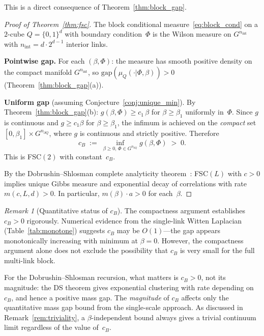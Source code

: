\documentclass[11pt,a4paper]{article}
\theoremstyle{plain}
\theoremstyle{definition}
\theoremstyle{remark}
\newtheorem{remark}[theorem]{Remark}
\newcommand{\gap}{\mathrm{gap}}
\begin{document}
This is a direct consequence of Theorem~\ref{thm:block_gap}.

\begin{proof}[Proof of Theorem~\ref{thm:fsc}]
The block conditional measure~\eqref{eq:block_cond} on a
$2$-cube $Q = \{0, 1\}^d$ with boundary condition~$\Phi$
is the Wilson measure on $G^{n_{\mathrm{int}}}$ with
$n_{\mathrm{int}} = d \cdot 2^{d-1}$ interior links.

\textbf{Pointwise gap.}
For each $(\beta, \Phi)$: the measure has smooth positive
density on the compact manifold $G^{n_{\mathrm{int}}}$,
so $\gap(\mu_Q(\cdot|\Phi,\beta)) > 0$
(Theorem~\ref{thm:block_gap}(a)).

\textbf{Uniform gap}
(assuming Conjecture~\ref{conj:unique_min}).
By Theorem~\ref{thm:block_gap}(b):
$g(\beta, \Phi) \geq c_1\,\beta$ for $\beta \geq \beta_1$
uniformly in~$\Phi$.  Since $g$ is continuous and
$g \geq c_1\beta$ for $\beta \geq \beta_1$,
the infimum is achieved on the \emph{compact} set
$[0, \beta_1] \times G^{n_{\partial Q}}$, where $g$
is continuous and strictly positive.  Therefore
\begin{equation}
  c_B \;:=\;
  \inf_{\beta \geq 0,\, \Phi \in G^{n_{\partial Q}}}
  g(\beta, \Phi) \;>\; 0.
\end{equation}
This is FSC$(2)$ with constant~$c_B$.

By the Dobrushin--Shlosman complete analyticity
theorem~\cite{DobrushinShlosman,Martinelli1999}:
FSC$(L)$ with $c > 0$ implies unique Gibbs measure
and exponential decay of correlations with rate
$m(c, L, d) > 0$. In particular,
$m(\beta) \cdot a > 0$ for each~$\beta$.
\end{proof}

\begin{remark}[Quantitative status of $c_B$]
\label{rem:fsc_order1}
The compactness argument establishes $c_B > 0$ rigorously.
Numerical evidence from the single-link Witten Laplacian
(Table~\ref{tab:monotone}) suggests $c_B$ may be $O(1)$---the
gap appears monotonically increasing with minimum at $\beta = 0$.
However, the compactness argument alone does not exclude the
possibility that $c_B$ is very small for the full multi-link
block.

For the Dobrushin--Shlosman recursion, what matters is
$c_B > 0$, not its magnitude: the DS theorem gives exponential
clustering with rate depending on~$c_B$, and hence a positive
mass gap.  The \emph{magnitude} of $c_B$ affects only the
quantitative mass gap bound from the single-scale approach.
As discussed in Remark~\ref{rem:triviality}, a
$\beta$-independent bound always gives a trivial continuum limit
regardless of the value of~$c_B$.
\end{remark}
\end{document}
